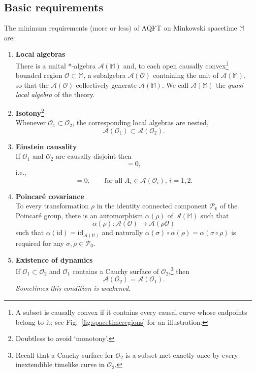 \documentclass[12pt,a4paper]{article}
\newcommand{\1}{\mathds{1}}                         %
\newcommand{\Ocal}{\mathcal{O}}
\newcommand{\MM}{\mathbb{M}}
\newcommand{\Ac}{{\mathcal{A}}}
\newcommand{\Pc}{{\mathcal{P}}}
\newcommand{\id}{{\textrm{id}}}
\begin{document}
	\subsection{Basic requirements}
	The minimum requirements (more or less) of AQFT on Minkowski spacetime $\MM$ are:
	\begin{enumerate}[label=\bf A\arabic{enumi},leftmargin=*,widest=4] 
		\item\label{it:loc} {\bf Local algebras}\\
		There is a unital $*$-algebra $\Ac(\MM)$ and, 
		to each open causally convex\footnote{A subset is causally convex if it contains every causal curve whose endpoints belong to it; see Fig.~\ref{fig:spacetimeregions} for an illustration.} bounded region $\Ocal\subset\MM$, a subalgebra $\Ac(\Ocal)$ containing the unit of $\Ac(\MM)$, so that the $\Ac(\Ocal)$ collectively generate $\Ac(\MM)$. We call $\Ac(\MM)$ the \emph{quasi-local algebra} of the theory.
		\item\label{it:iso} {\bf Isotony}\footnote{Doubtless to avoid `monotony'.}\\
		Whenever $\Ocal_1\subset \Ocal_2$, the corresponding local algebras are nested, 
		\begin{equation}
		 \Ac(\Ocal_1)\subset \Ac(\Ocal_2).
		\end{equation} 
		\item\label{it:Eins} {\bf Einstein causality}\\ If $\Ocal_1$ and $\Ocal_2$ are causally disjoint then
		\begin{equation}
		[\Ac(\Ocal_1),\Ac(\Ocal_2)] = 0,
		\end{equation}
		i.e., 
		\begin{equation}
			[ A_1, A_2] = 0,\qquad\text{for all $A_i\in\Ac(\Ocal_i)$, $i=1,2$}.
		\end{equation} 
		\item\label{it:Poinc} {\bf Poincar\'e covariance}\\
		To every transformation $\rho$ in the identity connected component $\Pc_0$ of the Poincar\'e group, there is an automorphism $\alpha(\rho)$ of $\Ac(\MM)$ such that
		\begin{equation}
		\alpha(\rho):\Ac(\Ocal)\to \Ac(\rho \Ocal)
		\end{equation}
		such that $\alpha(\id)=\id_{\Ac(\MM)}$
		and naturally $\alpha(\sigma) \circ\alpha(\rho)  = \alpha(\sigma\circ\rho)$ is required for any  $\sigma,\rho\in\Pc_0$.  
		\item\label{it:dyn} {\bf Existence of dynamics}\\
		If $\Ocal_1\subset \Ocal_2$ and $\Ocal_1$ contains a Cauchy surface of $\Ocal_2$,\footnote{Recall that a Cauchy surface for $\Ocal_2$ is a subset met exactly once by every inextendible timelike curve in $\Ocal_2$.} then 
		\begin{equation}
		\Ac(\Ocal_2) = \Ac(\Ocal_1).
		\end{equation}
	 \emph{Sometimes this condition is weakened.}
	\end{enumerate}
\end{document}
